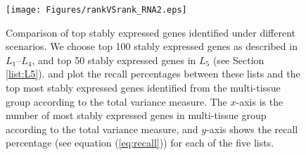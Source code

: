 		
		\begin{figure}[h!]
			\begin{center}
				\texttt{[image: Figures/rankVSrank\_RNA2.eps]}
				\caption{Comparison of top stably expressed genes identified under different scenarios.
					We choose top 100 stably expressed genes as described in $L_1$--$L_4$,
					and top 50 stably expressed genes in $L_5$ (see Section \ref{list:L5}). 
					and plot the recall percentages between these lists and the top most
					stably expressed genes identified from the  multi-tissue group
					according to the total variance measure.
					The $x$-axis is the number of most stably expressed genes in multi-tissue
					group according to the total variance measure, and $y$-axis shows the
					recall percentage (see equation (\ref{eq:recall}))  for each of the
					five lists.}
				\label{fig:rankVSrank_RNA}
			\end{center}
		\end{figure}
		
